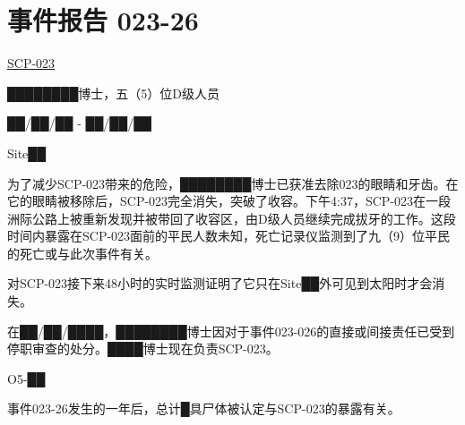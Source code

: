 \section{事件报告 023-26}

\label{sec:DOC-incident-report-023-26}

\hyperref[chap:SCP-023]{SCP-023}

████████博士，五（5）位D级人员

██\slash ██\slash ██ - ██\slash ██\slash ██

Site██


为了减少SCP-023带来的危险，████████博士已获准去除023的眼睛和牙齿。在它的眼睛被移除后，SCP-023完全消失，突破了收容。下午4:37，SCP-023在一段洲际公路上被重新发现并被带回了收容区，由D级人员继续完成拔牙的工作。这段时间内暴露在SCP-023面前的平民人数未知，死亡记录仪监测到了九（9）位平民的死亡或与此次事件有关。

对SCP-023接下来48小时的实时监测证明了它只在Site██外可见到太阳时才会消失。


在██\slash ██\slash ████，████████博士因对于事件023-026的直接或间接责任已受到停职审查的处分。████博士现在负责SCP-023。


O5-██

事件023-26发生的一年后，总计█具尸体被认定与SCP-023的暴露有关。
